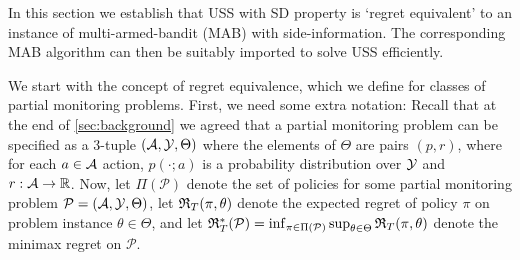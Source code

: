 \newcommand{\one}[1]{\mathbb{I}_{\{#1\}}}
\newcommand{\Pside}{\P_{\mathrm{side}}\xspace}
\newcommand{\PSAP}{\P_{\mathrm{SAP}}\xspace}
\newcommand{\PUSS}{\P_{\mathrm{USS}}\xspace}
\renewcommand{\P}{\mathcal{P}}

In this section we establish that USS with SD property is `regret equivalent' to an instance of multi-armed-bandit (MAB) with side-information. The corresponding MAB algorithm can then be suitably imported to solve USS efficiently.   

We start with the concept of regret equivalence, which we define for classes of partial monitoring problems.
First, we need some extra notation: Recall that at the end of \cref{sec:background} we agreed that 
a partial monitoring problem can be specified as a 3-tuple $(\mathcal{A},\mathcal{Y},\Theta)$ where the elements of $\Theta$ are pairs $(p,r)$,
where for each $a\in \mathcal{A}$ action, $p(\cdot;a)$ is a probability distribution over $\mathcal{Y}$ and $r: \mathcal{A} \to \mathbb{R}$.
Now, let $\Pi(\P)$ denote the set of policies for some partial monitoring problem $\P = (\A,\Y,\Theta)$,
let $\mathfrak{R}_T(\pi,\theta)$ denote the expected regret of policy $\pi$ on problem instance $\theta\in \Theta$,
and let $\Regret_T^*(\P) = \inf_{\pi\in \Pi(\P)}\sup_{\theta\in \Theta} \Regret_T(\pi,\theta)$ denote the minimax regret on $\P$.

